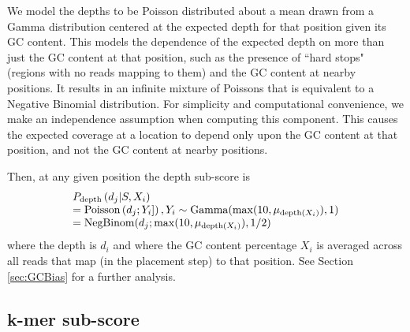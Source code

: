 \documentclass[phd,tocprelim]{cornell}
\begin{document}
We model the depths to be Poisson distributed about a mean drawn from a Gamma distribution centered at the expected depth for that position given its GC content. This models the dependence of the expected depth on more than just the GC content at that position, such as the presence of ``hard stops" (regions with no reads mapping to them) and the GC content at nearby positions. It results in an infinite mixture of Poissons that is equivalent to a Negative Binomial distribution. For simplicity and computational convenience, we make an independence assumption when computing this component.  This causes the expected coverage at a location to depend only upon the GC content at that position, and not the GC content at nearby positions.

Then, at any given position the depth sub-score is
\begin{equation}
    \begin{array}{l}
        P_{\text{depth}}\left(d_{j}|S,X_{i}\right) \\
        = {\rm Poisson}\left(d_{j};Y_{i}]\right), Y_{i} \sim {\rm Gamma}(\max(10,\mu_{\text{depth}(X_{i})}), 1) \\
        = {\rm NegBinom}(d_{j}; \max(10, \mu_{\text{depth}(X_{i})}), 1/2)
    \end{array}
\end{equation}
where the depth is $d_{i}$ and where the GC content percentage $X_{i}$ is averaged across all reads that map (in the placement step) to that position. See Section \ref{sec:GCBias} for a further analysis.


\subsection{k-mer sub-score} %
\label{sub:kmersubscore}
\end{document}

